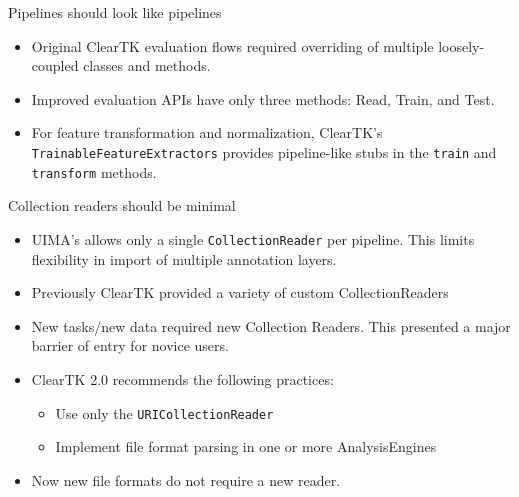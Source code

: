 \documentclass[final]{beamer}
\newcommand{\code}[1]{\texttt{\small #1}}
\begin{document}
\begin{frame}{}
\begin{columns}[t]
\begin{column}{.45\linewidth}
\begin{block}{Pipelines should look like pipelines}
\begin{itemize}
          \begin{itemize}
          \item Original ClearTK evaluation flows required overriding of multiple loosely-coupled classes and methods.
          \item Improved evaluation APIs have only three methods: Read, Train, and Test.
          \item For feature transformation and normalization, ClearTK's \code{TrainableFeatureExtractors} provides pipeline-like stubs in the \code{train} and \code{transform} methods.
          \end{itemize}
      \end{itemize}
    \end{block}
    
    \begin{block}{Collection readers should be minimal}
      \begin{itemize}
              \item UIMA's allows only a single \code{CollectionReader} per pipeline.  This limits flexibility in import of multiple annotation layers.
              \item Previously ClearTK provided a variety of custom CollectionReaders
              \item New tasks/new data required new Collection Readers. This presented a major barrier of entry for novice users.
              \item ClearTK 2.0 recommends the following practices:
                      \begin{itemize}
                      \item Use only the \code{URICollectionReader}
                      \item Implement file format parsing in one or more AnalysisEngines
                      \end{itemize}
              \item Now new file formats do not require a new reader.
      \end{itemize}
      


    \end{block}
  \end{column}


\end{columns}
\end{frame}
\end{document}
